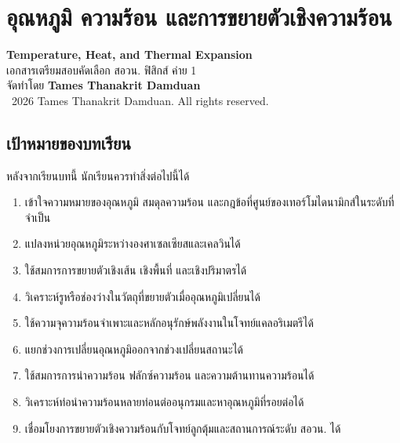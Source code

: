 
\chapter{อุณหภูมิ ความร้อน และการขยายตัวเชิงความร้อน}

\begin{center}
    {\Large \textbf{Temperature, Heat, and Thermal Expansion}}\\[4pt]
    {\normalsize เอกสารเตรียมสอบคัดเลือก สอวน. ฟิสิกส์ ค่าย 1}\\[6pt]
    {\normalsize จัดทำโดย \textbf{Tames Thanakrit Damduan}}\\[2pt]
    {\footnotesize \textcopyright\ 2026 Tames Thanakrit Damduan. All rights reserved.}\\[8pt]
\end{center}

\section*{เป้าหมายของบทเรียน}

หลังจากเรียนบทนี้ นักเรียนควรทำสิ่งต่อไปนี้ได้

\begin{enumerate}
    \item เข้าใจความหมายของอุณหภูมิ สมดุลความร้อน และกฎข้อที่ศูนย์ของเทอร์โมไดนามิกส์ในระดับที่จำเป็น
    \item แปลงหน่วยอุณหภูมิระหว่างองศาเซลเซียสและเคลวินได้
    \item ใช้สมการการขยายตัวเชิงเส้น เชิงพื้นที่ และเชิงปริมาตรได้
    \item วิเคราะห์รูหรือช่องว่างในวัตถุที่ขยายตัวเมื่ออุณหภูมิเปลี่ยนได้
    \item ใช้ความจุความร้อนจำเพาะและหลักอนุรักษ์พลังงานในโจทย์แคลอริเมตรีได้
    \item แยกช่วงการเปลี่ยนอุณหภูมิออกจากช่วงเปลี่ยนสถานะได้
    \item ใช้สมการการนำความร้อน ฟลักซ์ความร้อน และความต้านทานความร้อนได้
    \item วิเคราะห์ท่อนำความร้อนหลายท่อนต่ออนุกรมและหาอุณหภูมิที่รอยต่อได้
    \item เชื่อมโยงการขยายตัวเชิงความร้อนกับโจทย์ลูกตุ้มและสถานการณ์ระดับ สอวน. ได้
\end{enumerate}


